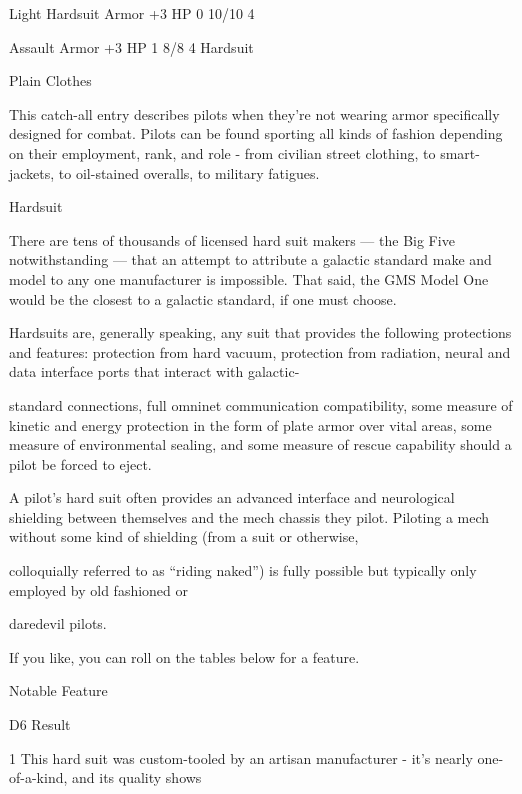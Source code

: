     Light Hardsuit      Armor               +3 HP                                0            10/10            4

    Assault             Armor               +3 HP                                1            8/8              4
    Hardsuit

                                                     Plain Clothes

This catch-all entry describes pilots when they’re not wearing armor specifically designed for
combat. Pilots can be found sporting all kinds of fashion depending on their employment, rank,
and role - from civilian street clothing, to smart-jackets, to oil-stained overalls, to military
fatigues.





                                                         Hardsuit

There are tens of thousands of licensed hard suit makers — the Big Five notwithstanding — that an attempt
to attribute a galactic standard make and model to any one manufacturer is impossible. That said, the GMS
Model One would be the closest to a galactic standard, if one must choose.

Hardsuits are, generally speaking, any suit that provides the following protections and features: protection
from hard vacuum, protection from radiation, neural and data interface ports that interact with galactic-

standard connections, full omninet communication compatibility, some measure of kinetic and energy
protection in the form of plate armor over vital areas, some measure of environmental sealing, and some
measure of rescue capability should a pilot be forced to eject.

A pilot’s hard suit often provides an advanced interface and neurological shielding between themselves and
the mech chassis they pilot. Piloting a mech without some kind of shielding (from a suit or otherwise,

colloquially referred to as ``riding naked'') is fully possible but typically only employed by old fashioned or

daredevil pilots.

If you like, you can roll on the tables below for a feature.


                                                       Notable Feature


  D6     Result

  1      This hard suit was custom-tooled by an artisan manufacturer - it’s nearly one-of-a-kind, and its quality shows


